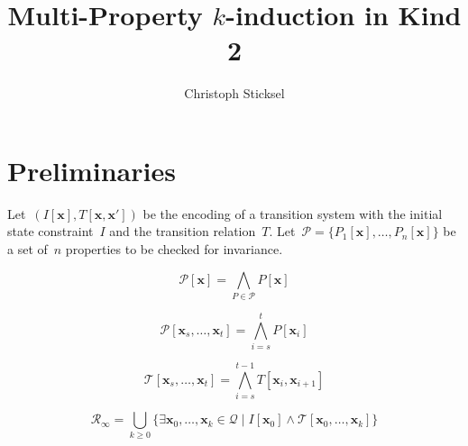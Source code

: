 \documentclass[12pt]{article}
\renewcommand{\textproc}{\textsl}
\renewcommand{\vec}[1]{\mathbf{#1}}            %
\newcommand{\sspace}{\ensuremath{\mathcal{Q}}}
\newcommand{\init}{\ensuremath{I}}
\newcommand{\transt}{\ensuremath{\mathcal{T}}}
\newcommand{\reachable}{\ensuremath{\mathcal{R}_\infty}}
\begin{document}
\title{Multi-Property $k$-induction in Kind 2}

\author{Christoph Sticksel}
\maketitle

\section{Preliminaries}
\label{sec:prelim}


Let~${(I[\vec x], T[\vec x, \vec x'])}$ be the encoding of a transition system with the initial state constraint~$I$ and the transition relation~$T$. Let~${\mathcal{P} = \{ P_1[\vec x], \dotsc, P_n[\vec x] \}}$ be a set of~$n$ properties to be checked for invariance.

\[ \mathcal{P}[\vec x] = \bigwedge_{P\in\mathcal{P}} P[\vec x] \]

\[ \mathcal{P}[\vec x_s,\dotsc,\vec x_t] = \bigwedge_{i=s}^t P[\vec x_i] \]

\[ \mathcal{T}[\vec x_s,\dotsc,\vec x_t] = \bigwedge_{i=s}^{t-1}  T[\vec x_i,\vec x_{i+1}]  \]

\[ \reachable = \bigcup_{k \geq 0} \{ \exists \vec x_0,\dotsc,\vec x_k \in \sspace \mid \init[\vec x_0] \land \transt[\vec x_0,\dotsc,\vec x_k] \} \]






\end{document}
